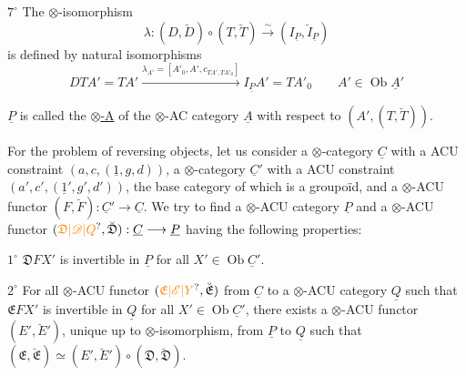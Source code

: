 $7^\circ$ The $\otimes$-isomorphism
\[
\lambda:(D,\breve D)\circ(T,\breve T)\xrightarrow{\sim}(I_{\underline P},\breve I_{\underline P})
\]
is defined by natural isomorphisms
\[
DTA'=TA'\xrightarrow{\lambda_{A'}=[A'_0,A',c_{TA',TA'_0}]}I_{\underline P}A'=TA'_0\qquad A'\in\operatorname{Ob}\underline A'
\]

$\underline P$ is called the \uline{$\otimes$-A\mbox{}} of the $\otimes$-AC category $\underline A$ with respect to $(A',(T,\breve T))$. 

For the problem of reversing objects, let us consider a $\otimes$-category
$\underline C$ with a ACU constraint $(a,c,(\underline{1},g,d))$, a $\otimes$-category $\underline C'$ with a ACU constraint $(a',c',(\underline{1}',g',d'))$, the base category of which is a groupoïd, and a $\otimes$-ACU functor $(F,\breve F):\underline C'\longrightarrow\underline C$. We try to find a $\otimes$-ACU category $\underline P$ and a $\otimes$-ACU functor $(\unsure{\mathfrak D|\mathscr D|Q},\breve{\mathfrak D}):\underline C\longrightarrow\underline P$ having the following properties:

$1^\circ$ $\mathfrak DFX'$ is invertible in $\underline P$ for all $X'\in\operatorname{Ob}\underline C'$.

$2^\circ$ For all $\otimes$-ACU functor $(\unsure{\mathfrak E|\mathscr E|Y},\breve{\mathfrak E})$ from $\underline C$ to a $\otimes$-ACU category $\underline Q$
such that $\mathfrak EFX'$ is invertible in $\underline Q$ for all $X'\in\operatorname{Ob}\underline C'$, there exists a $\otimes$-ACU functor $(E',\breve E')$, unique up to $\otimes$-isomorphism, from $\underline P$ to $\underline Q$ such that $(\mathfrak E,\breve{\mathfrak E})\simeq(E',\breve E')\circ(\mathfrak D,\breve{\mathfrak D})$.

